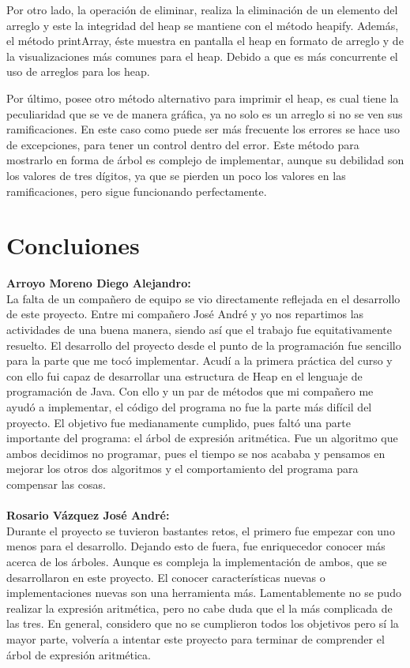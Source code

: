 \documentclass[12pt]{article}
\begin{document}
Por otro lado, la operación de eliminar, realiza la eliminación de un elemento del arreglo y este la integridad del heap se mantiene con el método heapify. Además, el método printArray, éste muestra en pantalla el heap en formato de arreglo y de la visualizaciones más comunes para el heap. Debido a que es más concurrente el uso de arreglos para los heap.

Por último, posee otro método alternativo para imprimir el heap, es cual tiene la peculiaridad que se ve de manera gráfica, ya no solo es un arreglo si no se ven sus ramificaciones. En este caso como puede ser más frecuente los errores se hace uso de excepciones, para tener un control dentro del error. Este método para mostrarlo en forma de árbol es complejo de implementar, aunque su debilidad  son los valores de tres dígitos, ya que se pierden un poco los valores en las ramificaciones, pero sigue funcionando perfectamente.

\section{Concluiones}

    \textbf{Arroyo Moreno Diego Alejandro: }\\
La falta de un compañero de equipo se vio directamente reflejada en el desarrollo de este proyecto. Entre mi compañero José André y yo nos repartimos las actividades de una buena manera, siendo así que el trabajo fue equitativamente resuelto. El desarrollo del proyecto desde el punto de la programación fue sencillo para la parte que me tocó implementar. Acudí a la primera práctica del curso y con ello fui capaz de desarrollar una estructura de Heap en el lenguaje de programación de Java. Con ello y un par de métodos que mi compañero me ayudó a implementar, el código del programa no fue la parte más difícil del proyecto. El objetivo fue medianamente cumplido, pues faltó una parte importante del programa: el árbol de expresión aritmética. Fue un algoritmo que ambos decidimos no programar, pues el tiempo se nos acababa y pensamos en mejorar los otros dos algoritmos y el comportamiento del programa para compensar las cosas.
    \\
    \\
    \textbf{Rosario Vázquez José André: }\\
Durante el proyecto se tuvieron bastantes retos, el primero fue empezar con uno menos para el desarrollo. Dejando esto de fuera, fue enriquecedor conocer más acerca de los árboles. Aunque es compleja la implementación de ambos, que se desarrollaron en este proyecto. El conocer características nuevas o implementaciones nuevas son una herramienta más. Lamentablemente no se pudo realizar la expresión aritmética, pero no cabe duda que el la más complicada de las tres. En general, considero que no se cumplieron todos los objetivos pero sí la mayor parte, volvería a intentar este proyecto para terminar de comprender el árbol de expresión aritmética.
\end{document}
